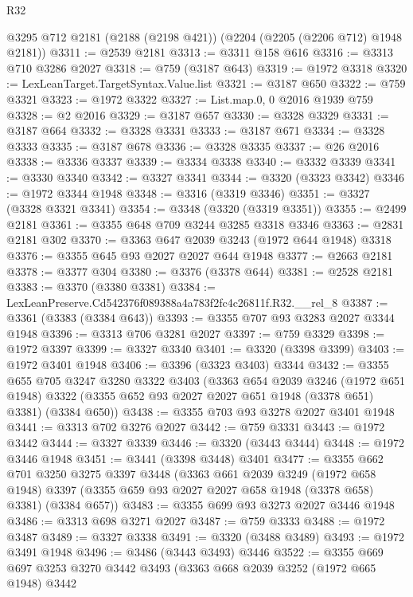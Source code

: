 \begin{lexlean}{R32}
\begin{coremodule}
    @3295
    @712
    @2181
    (@2188 (@2198 @421))
    (@2204 (@2205 (@2206 @712) @1948 @2181))
@3311 := @2539 @2181
@3313 := @3311 @158 @616
@3316 := @3313 @710 @3286 @2027
@3318 := @759 (@3187 @643)
@3319 := @1972 @3318
@3320 := LexLeanTarget.TargetSyntax.Value.list
@3321 := @3187 @650
@3322 := @759 @3321
@3323 := @1972 @3322
@3327 := List.map.{0, 0} @2016 @1939 @759
@3328 := @2 @2016
@3329 := @3187 @657
@3330 := @3328 @3329
@3331 := @3187 @664
@3332 := @3328 @3331
@3333 := @3187 @671
@3334 := @3328 @3333
@3335 := @3187 @678
@3336 := @3328 @3335
@3337 := @26 @2016
@3338 := @3336 @3337
@3339 := @3334 @3338
@3340 := @3332 @3339
@3341 := @3330 @3340
@3342 := @3327 @3341
@3344 := @3320 (@3323 @3342)
@3346 := @1972 @3344 @1948
@3348 := @3316 (@3319 @3346)
@3351 := @3327 (@3328 @3321 @3341)
@3354 := @3348 (@3320 (@3319 @3351))
@3355 := @2499 @2181
@3361 := @3355 @648 @709 @3244 @3285 @3318 @3346
@3363 := @2831 @2181 @302
@3370 := @3363 @647 @2039 @3243 (@1972 @644 @1948) @3318
@3376 := @3355 @645 @93 @2027 @2027 @644 @1948
@3377 := @2663 @2181
@3378 := @3377 @304
@3380 := @3376 (@3378 @644)
@3381 := @2528 @2181
@3383 := @3370 (@3380 @3381)
@3384 := LexLeanPreserve.Cd542376f089388a4a783f2fc4c26811f.R32.__rel_8
@3387 := @3361 (@3383 (@3384 @643))
@3393 := @3355 @707 @93 @3283 @2027 @3344 @1948
@3396 := @3313 @706 @3281 @2027
@3397 := @759 @3329
@3398 := @1972 @3397
@3399 := @3327 @3340
@3401 := @3320 (@3398 @3399)
@3403 := @1972 @3401 @1948
@3406 := @3396 (@3323 @3403) @3344
@3432 := @3355
    @655
    @705
    @3247
    @3280
    @3322
    @3403
    (@3363
      @654
      @2039
      @3246
      (@1972 @651 @1948)
      @3322
      (@3355 @652 @93 @2027 @2027 @651 @1948 (@3378 @651) @3381)
      (@3384 @650))
@3438 := @3355 @703 @93 @3278 @2027 @3401 @1948
@3441 := @3313 @702 @3276 @2027
@3442 := @759 @3331
@3443 := @1972 @3442
@3444 := @3327 @3339
@3446 := @3320 (@3443 @3444)
@3448 := @1972 @3446 @1948
@3451 := @3441 (@3398 @3448) @3401
@3477 := @3355
    @662
    @701
    @3250
    @3275
    @3397
    @3448
    (@3363
      @661
      @2039
      @3249
      (@1972 @658 @1948)
      @3397
      (@3355 @659 @93 @2027 @2027 @658 @1948 (@3378 @658) @3381)
      (@3384 @657))
@3483 := @3355 @699 @93 @3273 @2027 @3446 @1948
@3486 := @3313 @698 @3271 @2027
@3487 := @759 @3333
@3488 := @1972 @3487
@3489 := @3327 @3338
@3491 := @3320 (@3488 @3489)
@3493 := @1972 @3491 @1948
@3496 := @3486 (@3443 @3493) @3446
@3522 := @3355
    @669
    @697
    @3253
    @3270
    @3442
    @3493
    (@3363
      @668
      @2039
      @3252
      (@1972 @665 @1948)
      @3442

\end{coremodule}
\end{lexlean}
